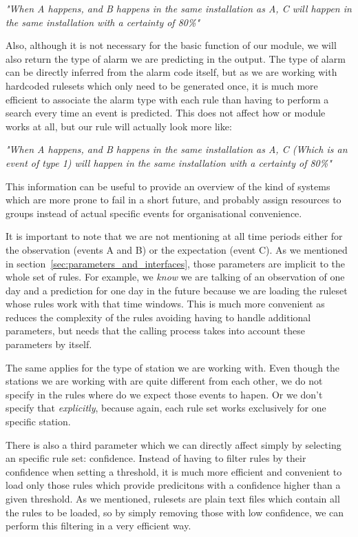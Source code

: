 \emph{"When A happens, and B happens in the same installation as A, C will happen in the same installation with a certainty of 80\%"}

Also, although it is not necessary for the basic function of our module, we will also return the type of alarm we are predicting in the output. The type of alarm can be directly inferred from the alarm code itself, but as we are working with hardcoded rulesets which only need to be generated once, it is much more efficient to associate the alarm type with each rule than having to perform a search every time an event is predicted. This does not affect how or module works at all, but our rule will actually look more like:

\emph{"When A happens, and B happens in the same installation as A, C (Which is an event of type 1) will happen in the same installation with a certainty of 80\%"}

This information can be useful to provide an overview of the kind of systems which are more prone to fail in a short future, and probably assign resources to groups instead of actual specific events for organisational convenience.

It is important to note that we are not mentioning at all time periods either for the observation (events A and B) or the expectation (event C). As we mentioned in section~\ref{sec:parameters_and_interfaces}, those parameters are implicit to the whole set of rules. For example, we \emph{know} we are talking of an observation of one day and a prediction for one day in the future because we are loading the ruleset whose rules work with that time windows. This is much more convenient as reduces the complexity of the rules avoiding having to handle additional parameters, but needs that the calling process takes into account these parameters by itself.

The same applies for the type of station we are working with. Even though the stations we are working with are quite different from each other, we do not specify in the rules where do we expect those events to hapen. Or we don't specify that \emph{explicitly}, because again, each rule set works exclusively for one specific station.

There is also a third parameter which we can directly affect simply by selecting an specific rule set: confidence. Instead of having to filter rules by their confidence when setting a threshold, it is much more efficient and convenient to load only those rules which provide predicitons with a confidence higher than a given threshold. As we mentioned, rulesets are plain text files which contain all the rules to be loaded, so by simply removing those with low confidence, we can perform this filtering in a very efficient way.

